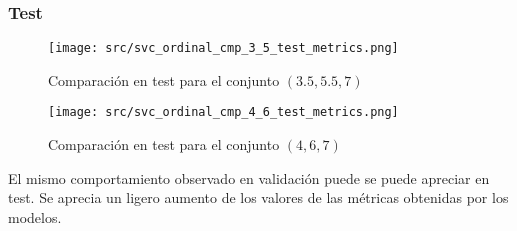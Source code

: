 \subsubsection*{Test}
\begin{figure}[H]
	\centering
	\texttt{[image: src/svc\_ordinal\_cmp\_3\_5\_test\_metrics.png]}
	\caption{Comparación en test para el conjunto  $(3.5,5.5,7)$}
	\label{fig:svc_ordin_test_cmp_1}
\end{figure}
\begin{figure}[H]
	\centering
	\texttt{[image: src/svc\_ordinal\_cmp\_4\_6\_test\_metrics.png]}
	\caption{Comparación en test para el conjunto  $(4,6,7)$}
	\label{fig:svc_ordin_test_cmp_2}
\end{figure}
El mismo comportamiento observado en validación puede se puede apreciar en test. Se aprecia un ligero aumento de los valores de las métricas obtenidas por los modelos.
\clearpage
